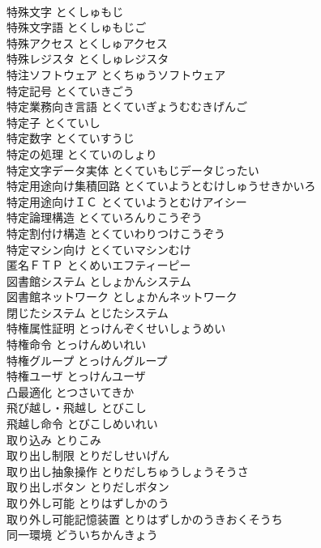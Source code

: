 \documentclass[8pt]{extreport}
\begin{document}
\begin{CJK}{UTF8}{min}
\\	特殊文字	とくしゅもじ	
\\	特殊文字語	とくしゅもじご	
\\	特殊アクセス	とくしゅアクセス	
\\	特殊レジスタ	とくしゅレジスタ	
\\	特注ソフトウェア	とくちゅうソフトウェア	
\\	特定記号	とくていきごう	
\\	特定業務向き言語	とくていぎょうむむきげんご	
\\	特定子	とくていし	
\\	特定数字	とくていすうじ	
\\	特定の処理	とくていのしょり	
\\	特定文字データ実体	とくていもじデータじったい	
\\	特定用途向け集積回路	とくていようとむけしゅうせきかいろ	
\\	特定用途向けＩＣ	とくていようとむけアイシー	
\\	特定論理構造	とくていろんりこうぞう	
\\	特定割付け構造	とくていわりつけこうぞう	
\\	特定マシン向け	とくていマシンむけ	
\\	匿名ＦＴＰ	とくめいエフティーピー	
\\	図書館システム	としょかんシステム	
\\	図書館ネットワーク	としょかんネットワーク	
\\	閉じたシステム	とじたシステム	
\\	特権属性証明	とっけんぞくせいしょうめい	
\\	特権命令	とっけんめいれい	
\\	特権グループ	とっけんグループ	
\\	特権ユーザ	とっけんユーザ	
\\	凸最適化	とつさいてきか	
\\	飛び越し・飛越し	とびこし	
\\	飛越し命令	とびこしめいれい	
\\	取り込み	とりこみ	
\\	取り出し制限	とりだしせいげん	
\\	取り出し抽象操作	とりだしちゅうしょうそうさ	
\\	取り出しボタン	とりだしボタン	
\\	取り外し可能	とりはずしかのう	
\\	取り外し可能記憶装置	とりはずしかのうきおくそうち	
\\	同一環境	どういちかんきょう	

\end{CJK}
\end{document}

